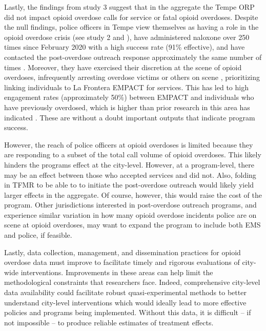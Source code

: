 Lastly, the findings from study 3 suggest that in the aggregate the Tempe ORP did not impact opioid overdose calls for service or fatal opioid overdoses. Despite the null findings, police officers in Tempe view themselves as having a role in the opioid overdose crisis (see study 2 and \cite{white_narcan_2021, white_moving_2021}), have administered naloxone over 250 times since February 2020 with a high success rate (91\% effective), and have contacted the post-overdose outreach response approximately the same number of times \parencite{watts_tempe_2023}. Moreover, they have exercised their discretion at the scene of opioid overdoses, infrequently arresting overdose victims or others on scene \parencite{white_leveraging_2022}, prioritizing linking individuals to La Frontera EMPACT for services. This has led to high engagement rates (approximately 50\%) between EMPACT and individuals who have previously overdosed, which is higher than prior research in this area has indicated \parencite{dahlem_recovery_2021, wagner_training_2016}. These are without a doubt important outputs that indicate program success. 

However, the reach of police officers at opioid overdoses is limited because they are responding to a subset of the total call volume of opioid overdoses. This likely hinders the programs effect at the city-level. However, at a program-level, there may be an effect between those who accepted services and did not. Also, folding in TFMR to be able to to initiate the post-overdose outreach would likely yield larger effects in the aggregate. Of course, however, this would raise the cost of the program. Other jurisdictions interested in post-overdose outreach programs, and experience similar variation in how many opioid overdose incidents police are on scene at opioid overdoses, may want to expand the program to include both EMS and police, if feasible.

Lastly, data collection, management, and dissemination practices for opioid overdose data must improve to facilitate timely and rigorous evaluations of city-wide interventions. Improvements in these areas can help limit the methodological constraints that researchers face. Indeed, comprehensive city-level data availability could facilitate robust quasi-experimental methods to better understand city-level interventions which would ideally lead to more effective policies and programs being implemented. Without this data, it is difficult -- if not impossible -- to produce reliable estimates of treatment effects.

